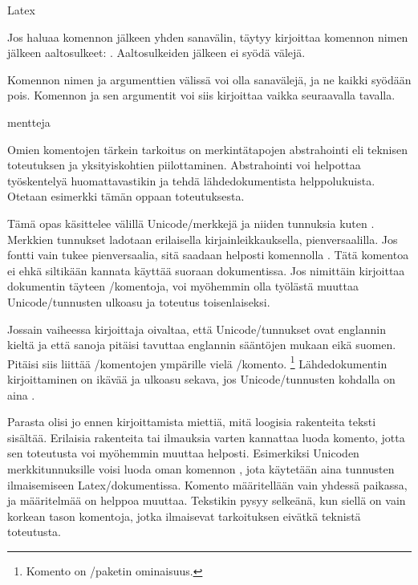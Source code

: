 \begin{tulossis}
  Latex
\end{tulossis}

Jos haluaa komennon jälkeen yhden sanavälin, täytyy kirjoittaa komennon
nimen jälkeen aaltosulkeet: . Aaltosulkeiden
jälkeen ei syödä välejä.

Komennon nimen ja argumenttien välissä voi olla sanavälejä, ja ne kaikki
syödään pois. Komennon ja sen argumentit voi siis kirjoittaa vaikka
seuraavalla tavalla.

\begin{koodilohkosis}
     {mentteja}
\end{koodilohkosis}

Omien komentojen tärkein tarkoitus on merkintätapojen abstrahointi eli
teknisen toteutuksen ja yksityiskohtien piilottaminen. Abstrahointi voi
helpottaa työskentelyä huomattavastikin ja tehdä lähdedokumentista
helppolukuista. Otetaan esimerkki tämän oppaan toteutuksesta.

Tämä opas käsittelee välillä Unicode\-/merkkejä ja niiden tunnuksia
kuten . Merkkien tunnukset
ladotaan erilaisella kirjainleikkauksella, pienversaalilla. Jos fontti
vain tukee pienversaalia, sitä saadaan helposti komennolla . Tätä komentoa ei ehkä siltikään kannata käyttää suoraan
dokumentissa. Jos nimittäin kirjoittaa dokumentin täyteen \-/komentoja, voi myöhemmin olla työlästä muuttaa
Unicode\-/tunnusten ulko\-asu ja toteutus toisenlaiseksi.

Jossain vaiheessa kirjoittaja oivaltaa, että Unicode\-/tunnukset ovat
englannin kieltä ja että sanoja pitäisi tavuttaa englannin sääntöjen
mukaan eikä suomen. Pitäisi siis liittää \-/komentojen ympärille vielä \-/komento.%
\footnote{Komento  on
  \-/paketin ominaisuus.} Lähdedokumentin
kirjoittaminen on ikävää ja ulko\-asu sekava, jos Unicode\-/tunnusten
kohdalla on aina .

Parasta olisi jo ennen kirjoittamista miettiä, mitä loogisia rakenteita
teksti sisältää. Erilaisia rakenteita tai ilmauksia varten kannattaa
luoda komento, jotta sen toteutusta voi myöhemmin muuttaa helposti.
Esimerkiksi Unicoden merkkitunnuksille voisi luoda oman komennon
, jota käytetään aina tunnusten ilmaisemiseen
Latex\-/dokumentissa. Komento määritellään vain yhdessä paikassa, ja
määritelmää on helppoa muuttaa. Tekstikin pysyy selkeänä, kun siellä on
vain korkean tason komentoja, jotka ilmaisevat tarkoituksen eivätkä
teknistä toteutusta.

